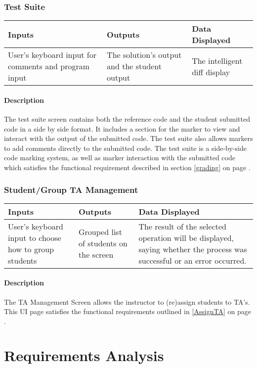 \documentclass{article}
\begin{document}
\section{Test Suite}
\begin{tabular}{| p{5cm} | p{5cm} | p{5cm} |}
	\hline
	Inputs & Outputs & Data Displayed \\ \hline
	User's keyboard input for comments and program input
	& The solution's output and the student output
	& The intelligent diff display
	
	\\ \hline
\end{tabular}

\subsection{Description}
The test suite screen contains both the reference code and the student submitted
code in a side by side format.  It includes a section for the marker to view
and interact with the output of the submitted code.  The test suite also allows
markers to add comments directly to the submitted code.  The test suite is a
side-by-side code marking system, as well as marker interaction with the
submitted code which satisfies the functional requirement described in section
\ref{grading} on page \pageref{grading}.

\section{Student/Group TA Management}
\begin{tabular}{| p{5cm} | p{5cm} | p{5cm} |}
	\hline
	Inputs & Outputs & Data Displayed \\ \hline
	User's keyboard input to choose how to group students
	& Grouped list of students on the screen
	& The result of the selected operation will be displayed, saying whether
the process was successful or an error occurred.
	\\ \hline
\end{tabular}

\subsection{Description}
The TA Management Screen allows the instructor to (re)assign students to TA's.
This UI page satisfies the functional requirements outlined in \ref{AssignTA}
on page \pageref{AssignTA}.

\part{Requirements Analysis}
\end{document}
